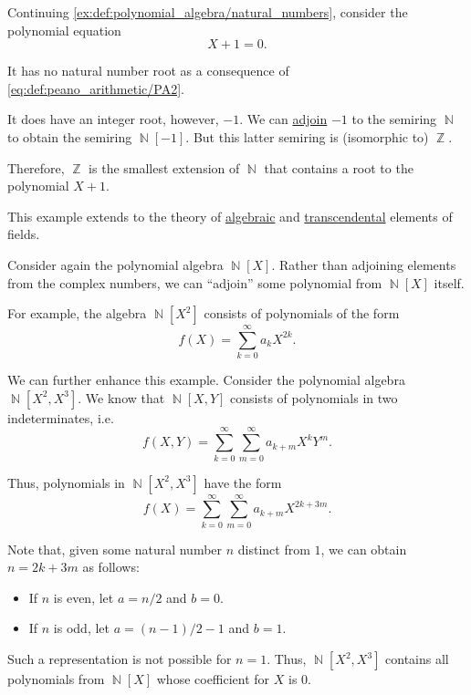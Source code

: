 \begin{example}\label{ex:adjoining_root}
  Continuing \cref{ex:def:polynomial_algebra/natural_numbers}, consider the polynomial equation
  \begin{equation*}
    X + 1 = 0.
  \end{equation*}

  It has no natural number root as a consequence of \eqref{eq:def:peano_arithmetic/PA2}.

  It does have an integer root, however, \( -1 \). We can \hyperref[def:semiring_adjunction]{adjoin} \( -1 \) to the semiring \( \BbbN \) to obtain the semiring \( \BbbN[-1] \). But this latter semiring is (isomorphic to) \( \BbbZ \).

  Therefore, \( \BbbZ \) is the smallest extension of \( \BbbN \) that contains a root to the polynomial \( X + 1 \).

  This example extends to the theory of \hyperref[def:algebraic_element]{algebraic} and \hyperref[def:transcendental_element]{transcendental} elements of fields.
\end{example}

\begin{example}\label{ex:adjoining_polynomial}
  Consider again the polynomial algebra \( \BbbN[X] \). Rather than adjoining elements from the complex numbers, we can \enquote{adjoin} some polynomial from \( \BbbN[X] \) itself.

  For example, the algebra \( \BbbN[X^2] \) consists of polynomials of the form
  \begin{equation*}
    f(X) = \sum_{k=0}^\infty a_k X^{2k}.
  \end{equation*}

  We can further enhance this example. Consider the polynomial algebra \( \BbbN[X^2, X^3] \). We know that \( \BbbN[X, Y] \) consists of polynomials in two indeterminates, i.e.
  \begin{equation*}
    f(X, Y) = \sum_{k=0}^\infty \sum_{m=0}^\infty a_{k+m} X^k Y^m.
  \end{equation*}

  Thus, polynomials in \( \BbbN[X^2, X^3] \) have the form
  \begin{equation*}
    f(X) = \sum_{k=0}^\infty \sum_{m=0}^\infty a_{k+m} X^{2k + 3m}.
  \end{equation*}

  Note that, given some natural number \( n \) distinct from \( 1 \), we can obtain \( n = 2k + 3m \) as follows:
  \begin{itemize}
    \item If \( n \) is even, let \( a = n / 2 \) and \( b = 0 \).
    \item If \( n \) is odd, let \( a = (n - 1) / 2 - 1 \) and \( b = 1 \).
  \end{itemize}

  Such a representation is not possible for \( n = 1 \). Thus, \( \BbbN[X^2, X^3] \) contains all polynomials from \( \BbbN[X] \) whose coefficient for \( X \) is \( 0 \).
\end{example}

